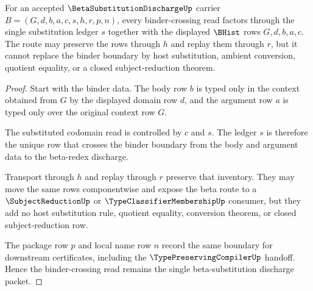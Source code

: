 \begin{theorem}
\label{thm:beta-substitution-discharge-binder-boundary}
For an accepted $\BetaSubstitutionDischargeUp$ carrier $B=(G,d,b,a,c,s,h,r,p,n)$, every binder-crossing read factors through the single substitution ledger $s$ together with the displayed $\BHist$ rows $G,d,b,a,c$. The route may preserve the rows through $h$ and replay them through $r$, but it cannot replace the binder boundary by host substitution, ambient conversion, quotient equality, or a closed subject-reduction theorem.
\end{theorem}
\begin{proof}
Start with the binder data. The body row $b$ is typed only in the context obtained from $G$ by the displayed domain row $d$, and the argument row $a$ is typed only over the original context row $G$.

The substituted codomain read is controlled by $c$ and $s$. The ledger $s$ is therefore the unique row that crosses the binder boundary from the body and argument data to the beta-redex discharge.

Transport through $h$ and replay through $r$ preserve that inventory. They may move the same rows componentwise and expose the beta route to a $\SubjectReductionUp$ or $\TypeClassifierMembershipUp$ consumer, but they add no host substitution rule, quotient equality, conversion theorem, or closed subject-reduction row.

The package row $p$ and local name row $n$ record the same boundary for downstream certificates, including the $\TypePreservingCompilerUp$ handoff. Hence the binder-crossing read remains the single beta-substitution discharge packet.
\end{proof}

